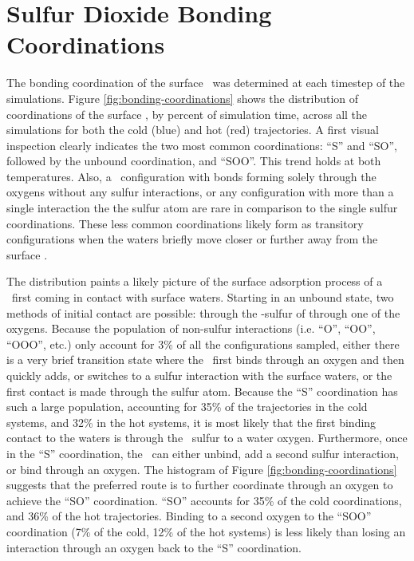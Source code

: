 \section {Sulfur Dioxide Bonding Coordinations}

The bonding coordination of the surface \suldiox~was determined at each timestep of the simulations. Figure \ref{fig:bonding-coordinations} shows the distribution of coordinations of the surface \suldiox, by percent of simulation time, across all the simulations for both the cold (blue) and hot (red) trajectories. A first visual inspection clearly indicates the two most common coordinations: ``S'' and ``SO'', followed by the unbound coordination, and ``SOO''. This trend holds at both temperatures. Also, a \suldiox~configuration with bonds forming solely through the oxygens without any sulfur interactions, or any configuration with more than a single interaction the the sulfur atom are rare in comparison to the single sulfur coordinations. These less common coordinations likely form as transitory configurations when the waters briefly move closer or further away from the surface \suldiox.

The distribution paints a likely picture of the surface adsorption process of a \suldiox~first coming in contact with surface waters. Starting in an unbound state, two methods of initial contact are possible: through the \suldiox-sulfur of through one of the oxygens. Because the population of non-sulfur interactions (i.e. ``O'', ``OO'', ``OOO'', etc.) only account for 3\% of all the configurations sampled, either there is a very brief transition state where the \suldiox~first binds through an oxygen and then quickly adds, or switches to a sulfur interaction with the surface waters, or the first contact is made through the sulfur atom. Because the ``S'' coordination has such a large population, accounting for 35\% of the trajectories in the cold systems, and 32\% in the hot systems, it is most likely that the first binding contact to the waters is through the \suldiox~sulfur to a water oxygen. Furthermore, once in the ``S'' coordination, the \suldiox~can either unbind, add a second sulfur interaction, or bind through an oxygen. The histogram of Figure \ref{fig:bonding-coordinations} suggests that the preferred route is to further coordinate through an oxygen to achieve the ``SO'' coordination. ``SO'' accounts for 35\% of the cold coordinations, and 36\% of the hot trajectories. Binding to a second oxygen to the ``SOO'' coordination (7\% of the cold, 12\% of the hot systems) is less likely than losing an interaction through an oxygen back to the ``S'' coordination.

